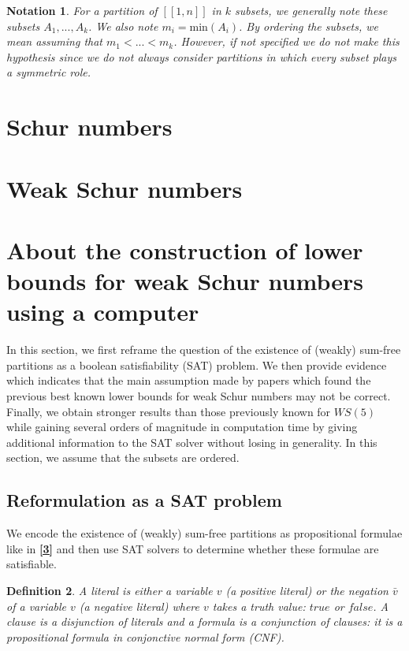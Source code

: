\documentclass{article}
\newtheorem{definition}{Definition}[section]
\newtheorem{notation}[definition]{Notation}
\newtheorem{computational theorem}{Computational Theorem}[section]
\begin{document}
\begin{notation}
For a partition of \([\![1, n]\!]\) in \(k\) subsets, we generally note these subsets \(A_1, ..., A_k\). We also note \(m_i = \text{min}(A_i)\). 
By ordering the subsets, we mean assuming that \(m_1 < ... < m_k\). However, if not specified we do not make this hypothesis since we 
do not always consider partitions in which every subset plays a symmetric role.
\end{notation}



\section{Schur numbers}



\section{Weak Schur numbers}



\section{About the construction of lower bounds for weak Schur numbers using a computer}

In this section, we first reframe the question of the existence of (weakly) sum-free partitions as a boolean
satisfiability (SAT) problem. We then provide evidence which indicates that the main assumption made by papers which
found the previous best known lower bounds for weak Schur numbers may not be correct. Finally, we obtain stronger
results than those previously known for \(WS(5)\) while gaining several orders of magnitude in computation time by 
giving additional information to the SAT solver without losing in generality. In this section, we assume that the subsets are ordered.


\subsection{Reformulation as a SAT problem}

We encode the existence of (weakly) sum-free partitions as propositional formulae like in \hyperlink{label3}{\textbf{[3]}} and then use 
SAT solvers to determine whether these formulae are satisfiable.

\begin{definition}
A \textit{literal} is either a variable \(v\) (a positive literal) or the negation \(\bar{v}\) of a variable \(v\) (a negative literal) where \(v\) 
takes a truth value: \(true\) or \(false\). A \textit{clause} is a disjunction of literals and a \textit{formula} is a conjunction of clauses: it 
is a propositional formula in \textit{conjonctive normal form} (CNF).
\end{definition}
\end{document}
